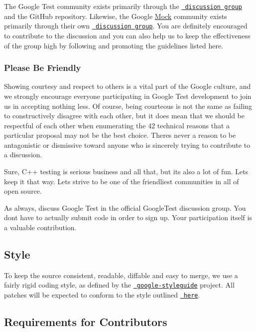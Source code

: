 The Google Test community exists primarily through the \href{http://groups.google.com/group/googletestframework}{\texttt{ discussion group}} and the Git\+Hub repository. Likewise, the Google \mbox{\hyperlink{classMock}{Mock}} community exists primarily through their own \href{http://groups.google.com/group/googlemock}{\texttt{ discussion group}}. You are definitely encouraged to contribute to the discussion and you can also help us to keep the effectiveness of the group high by following and promoting the guidelines listed here.

\subsubsection*{Please Be Friendly}

Showing courtesy and respect to others is a vital part of the Google culture, and we strongly encourage everyone participating in Google Test development to join us in accepting nothing less. Of course, being courteous is not the same as failing to constructively disagree with each other, but it does mean that we should be respectful of each other when enumerating the 42 technical reasons that a particular proposal may not be the best choice. There\textquotesingle{}s never a reason to be antagonistic or dismissive toward anyone who is sincerely trying to contribute to a discussion.

Sure, C++ testing is serious business and all that, but it\textquotesingle{}s also a lot of fun. Let\textquotesingle{}s keep it that way. Let\textquotesingle{}s strive to be one of the friendliest communities in all of open source.

As always, discuss Google Test in the official Google\+Test discussion group. You don\textquotesingle{}t have to actually submit code in order to sign up. Your participation itself is a valuable contribution.

\subsection*{Style}

To keep the source consistent, readable, diffable and easy to merge, we use a fairly rigid coding style, as defined by the \href{https://github.com/google/styleguide}{\texttt{ google-\/styleguide}} project. All patches will be expected to conform to the style outlined \href{https://google.github.io/styleguide/cppguide.html}{\texttt{ here}}.

\subsection*{Requirements for Contributors}

